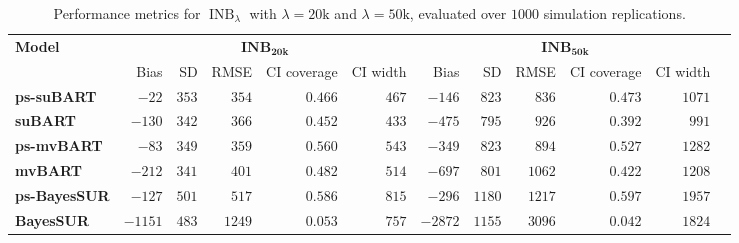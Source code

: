 \documentclass[aoas,preprint]{imsart}
\theoremstyle{plain}
\theoremstyle{definition}
\theoremstyle{remark}
\begin{document}
\begin{table}[H]
\caption{Performance metrics for $\operatorname{INB}_\lambda$ with $\lambda = 20\mathrm{k}$ and $\lambda=50\mathrm{k}$, evaluated over $1000$ simulation replications. \label{tab:results_INB}}
\setlength{\tabcolsep}{3.21pt}
\begin{tabular}{lrrrrrrrrrrr}
\multirow{2}{*}{\textbf{Model}} &\multicolumn{5}{c}{$\textbf{INB}_{\mathbf{20k}}$}&\multicolumn{5}{c}{$\textbf{INB}_{\mathbf{50k}}$}\\
\cline{2-11}
 & Bias & SD & RMSE & CI coverage & CI width & Bias & SD & RMSE & CI coverage & CI width \\
\hline
\textbf{ps-suBART} &$-22$& $353$& $354$& $0.466$& $467$& $-146$ & $823$& $836$& $0.473$& $1071$ \\
\textbf{suBART} & $-130$& $342$& $366$& $0.452$& $433$& $-475$& $795$& $926$& $0.392$& $991$\\
\textbf{ps-mvBART} & $-83$& $349$& $359$& $0.560$& $543$& $-349$& $823$& $894$ & $0.527$& $1282$\\
\textbf{mvBART} & $-212$& $341$& $401$& $0.482$& $514$& $-697$& $801$& $1062$& $0.422$& $1208$\\
\textbf{ps-BayesSUR} & $-127$& $501$& $517$& $0.586$& $815$& $-296$& $1180$& $1217$& $0.597$& $1957$\\
\textbf{BayesSUR} & $-1151$& $483$& $1249$& $0.053$& $757$& $-2872$& $1155$& $3096$& $0.042$& $1824$
\end{tabular}
\end{table}
\end{document}

